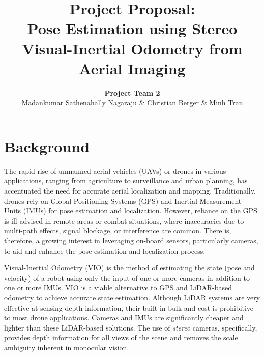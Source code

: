 \documentclass[10pt,letterpaper]{article}
\title{
\Large{\textbf{Project Proposal: \\
Pose Estimation using Stereo Visual-Inertial Odometry from Aerial Imaging}}
}
\date{}
\author{
  \textbf{Project Team 2} \\
  Madankumar Sathenahally Nagaraju & Christian Berger & Minh Tran \\
}
\begin{document}
\maketitle
\thispagestyle{empty}

\section*{Background}
The rapid rise of unmanned aerial vehicles (UAVs) or drones in various applications, ranging from agriculture to surveillance and urban planning, has accentuated the need for accurate aerial localization and mapping. Traditionally, drones rely on Global Positioning Systems (GPS) and Inertial Measurement Units (IMUs) for pose estimation and localization. However, reliance on the GPS is ill-advised in remote areas or combat situations, where inaccuracies due to multi-path effects, signal blockage, or interference are common. There is, therefore, a growing interest in leveraging on-board sensors, particularly cameras, to aid and enhance the pose estimation and localization process.


Visual-Inertial Odometry (VIO) is the method of estimating the state (pose and velocity) of a robot using only the input of one or more cameras in addition to one or more IMUs. VIO is a viable alternative to GPS and LiDAR-based odometry to achieve accurate state estimation. Although LiDAR systems are very effective at sensing depth information, their built-in bulk and cost is prohibitive to most drone applications. Cameras and IMUs are significantly cheaper and lighter than these LiDAR-based solutions. The use of \textit{stereo} cameras, specifically, provides depth information for all views of the scene and removes the scale ambiguity inherent in monocular vision. 
\end{document}
